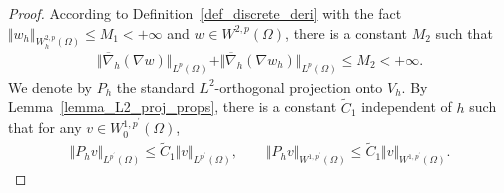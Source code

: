 \documentclass[12pt]{amsart}
\theoremstyle{definition}
\theoremstyle{remark}
\begin{document}
\begin{proof}
According to Definition~\ref{def_discrete_deri} with the fact $\Vert w_{h} \Vert_{W_{h}^{2,p}(\Omega)} \leq M_{1}
< + \infty$ and $w\in W^{2,p}(\Omega)$, there is a constant $M_{2}$ such that 
\begin{align}
\label{discrete_second_deri_bound}
\Vert \overline{\nabla}_{h}(\nabla w) \Vert_{L^{p}(\Omega)} 
+ \Vert \overline{\nabla}_{h} (\nabla w_{h})\Vert_{L^{p}(\Omega)} \leq M_{2} < + \infty.
\end{align}
We denote by $P_{h}$ the standard $L^{2}$-orthogonal projection onto $V_{h}$.
By Lemma~\ref{lemma_L2_proj_props}, there is a constant $\tilde{C}_{1}$ independent of $h$ 
such that for any $v \in W_{0}^{1,p^{\prime}}(\Omega)$, 
\begin{align}
\label{L2_projection_bound1}
\Vert P_{h} v\Vert_{L^{p^{\prime}}(\Omega)} \leq \tilde{C}_{1} \Vert v\Vert_{L^{p^{\prime}}(\Omega)}, 
\qquad \Vert P_{h} v\Vert_{W^{1,p^{\prime}}(\Omega)} \leq \tilde{C}_{1} \Vert v\Vert_{W^{1,p^{\prime}}(\Omega)}.
\end{align}


\end{proof}
\end{document}
